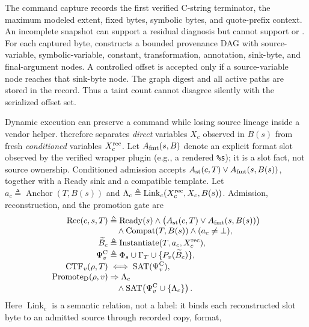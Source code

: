 The command capture records the first verified C-string terminator, the maximum
modeled extent, fixed bytes, symbolic bytes, and quote-prefix context. An
incomplete snapshot can support a residual diagnosis but cannot support
\mfilt or \nms. For each captured byte, \tool constructs a bounded provenance
DAG with source-variable, symbolic-variable, constant, transformation,
annotation, sink-byte, and final-argument nodes. A controlled offset is accepted
only if a source-variable node reaches that sink-byte node. The graph digest and
all active paths are stored in the record. Thus a taint count cannot disagree
silently with the serialized offset set.

Dynamic execution can preserve a command while losing source lineage inside a
vendor helper. \tool therefore separates \emph{direct} variables $X_c$ observed
in $B(s)$ from fresh \emph{conditioned} variables $X_c^{\rm rec}$. Let
$A_{\rm fmt}(s,B)$ denote an explicit format slot observed by the verified
wrapper plugin (e.g., a rendered \texttt{\%s}); it is a slot fact, not source
ownership. Conditioned admission accepts $A_{\rm st}(c,T)\lor
A_{\rm fmt}(s,B(s))$, together with a Ready sink and a compatible template.
Let $a_c\triangleq\operatorname{Anchor}(T,B(s))$ and
$\Lambda_c\triangleq\operatorname{Link}_c(X_c^{\rm rec},X_c,B(s))$. Admission,
reconstruction, and the promotion gate are
\begin{equation}
\begin{aligned}
\operatorname{Rec}(c,s,T)&\triangleq\operatorname{Ready}(s)
  \land\bigl(A_{\rm st}(c,T)\lor A_{\rm fmt}(s,B(s))\bigr)\\[-1mm]
 &\quad\land\operatorname{Compat}(T,B(s))\land(a_c\neq\bot),\\[-1mm]
\widetilde B_c&\triangleq\operatorname{Instantiate}(T,a_c,X_c^{\rm rec}),\\[-1mm]
\Psi^{\rm C}_v&\triangleq\Phi_s\cup\Gamma_T
  \cup\{P_v(\widetilde B_c)\},\\[-1mm]
\operatorname{CTF}_v(\rho,T)&\iff\operatorname{SAT}(\Psi^{\rm C}_v),\\[-1mm]
\operatorname{Promote}_{\rm D}(\rho,v)&\Rightarrow\Lambda_c\\[-1mm]
 &\quad\land\operatorname{SAT}\!\left(\Psi^{\rm C}_v\cup\{\Lambda_c\}\right).
\end{aligned}
\label{eq:conditioned-evidence}
\end{equation}
Here $\operatorname{Link}_c$ is a semantic relation, not a label: it binds each
reconstructed slot byte to an admitted source through recorded copy, format,
